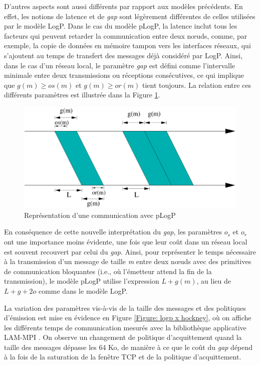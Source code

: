 D'autres aspects sont aussi différents par rapport aux modèles précédents.
En effet, les notions de latence et de \emph{gap} sont légèrement
différentes de celles utilisées par le modèle LogP. Dans le
cas du modèle pLogP, la latence inclut tous les facteurs qui peuvent
retarder la communication entre deux n{\oe}uds, comme, par exemple,
la copie de données en mémoire tampon vers les interfaces réseaux,
qui s'ajoutent au temps de transfert des messages déjà considéré par
LogP. Ainsi, dans le cas d'un réseau local, le paramètre \emph{gap}
est défini comme l'intervalle minimale entre deux transmissions ou
réceptions consécutives, ce qui implique que $g(m)\geq os(m)$ et
$g(m)\geq or(m)$ tient toujours. La relation entre ces différents
paramètres est illustrée dans la Figure \ref{Figure: pLogP}. 

%
\begin{figure}[h]
\centering
\includegraphics[width=0.7\linewidth]{images/p2p/plogp-struct}

\caption{\label{Figure: pLogP}Représentation d'une communication avec pLogP}

\end{figure}


En conséquence de cette nouvelle interprétation du \emph{gap}, les
paramètres $o_{s}$ et $o_{r}$ ont une importance moins évidente,
une fois que leur coût dans un réseau local est souvent recouvert
par celui du \textit{gap}.  Ainsi, pour représenter le temps nécessaire à la transmission d'un
message de taille \emph{m} entre deux n{\oe}uds avec des primitives de
communication bloquantes (i.e., où l'émetteur attend la fin de la transmission), le modèle pLogP utilise l'expression $L+g(m)$,
au lieu de $L+g+2o$ comme dans le modèle LogP. 


La variation des paramètres vis-à-vis de la taille des messages et des politiques d'émission est mise en évidence en Figure \ref{Figure: logp x hockney}, où on affiche les différents temps de communication mesurés avec la bibliothèque applicative LAM-MPI \cite{LAM04}. On observe un
changement de politique d'acquittement quand la taille des messages dépasse les 64 Ko, de manière à ce que le coût du \textit{gap} dépend à la fois
de la saturation de la fenêtre TCP et de la politique d'acquittement.

